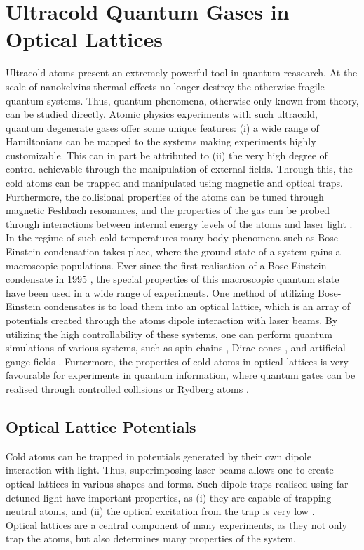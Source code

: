 \chapter{Ultracold Quantum Gases in Optical Lattices}

Ultracold atoms present an extremely powerful tool in quantum reasearch. At the scale of nanokelvins thermal effects no longer destroy the otherwise fragile quantum systems. Thus, quantum phenomena, otherwise only known from theory, can be studied directly. Atomic physics experiments with such ultracold, quantum degenerate gases offer some unique features: (i) a wide range of Hamiltonians can be mapped to the systems making experiments highly customizable. This can in part be attributed to (ii) the very high degree of control achievable through the manipulation of external fields. Through this, the cold atoms can be trapped and manipulated using magnetic and optical traps. Furthermore, the collisional properties of the atoms can be tuned through magnetic Feshbach resonances, and the properties of the gas can be probed through interactions between internal energy levels of the atoms and laser light \cite{JakschZoller, Bloch2012}.\\
In the regime of such cold temperatures many-body phenomena such as Bose-Einstein condensation takes place, where the ground state of a system gains a macroscopic populations. Ever since the first realisation of a Bose-Einstein condensate in 1995 \cite{WiemanCornell1995}, the special properties of this macroscopic quantum state have been used in a wide range of experiments. One method of utilizing Bose-Einstein condensates is to load them into an optical lattice, which is an array of potentials created through the atoms dipole interaction with laser beams. By utilizing the high controllability of these systems, one can perform quantum simulations of various systems, such as spin chains \cite{Simon2011}, Dirac cones \cite{Tarruell2012}, and artificial gauge fields \cite{Dalibard2011}. Furtermore, the properties of cold atoms in optical lattices is very favourable for experiments in quantum information, where quantum gates can be realised through controlled collisions \cite{Zoller1999} or Rydberg atoms \cite{Molmer2010}.\\

\section{Optical Lattice Potentials}
Cold atoms can be trapped in potentials generated by their own dipole interaction with light. Thus, superimposing laser beams allows one to create optical lattices in various shapes and forms. Such dipole traps realised using far-detuned light have important properties, as (i) they are capable of trapping neutral atoms, and (ii) the optical excitation from the trap is very low \cite{grimm}.\\
Optical lattices are a central component of many experiments, as they not only trap the atoms, but also determines many properties of the system.

